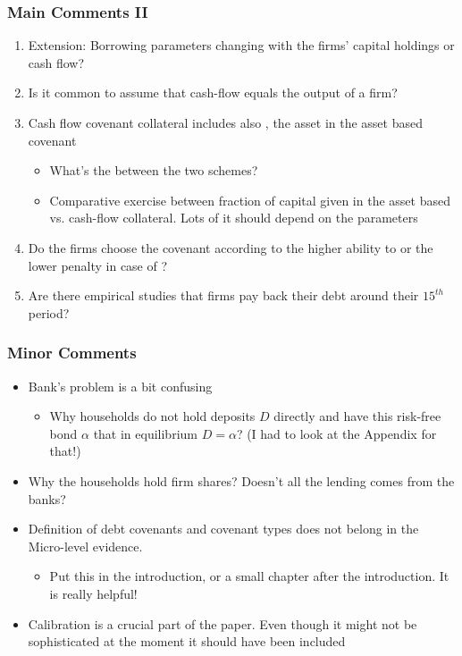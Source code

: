 \documentclass[xcolor=dvipsnames,handout]{beamer}
\begin{document}
\begin{frame}[t]\frametitle {\textbf{Main Comments II}} \label{conclusion}
\begin{enumerate} 
\item Extension: Borrowing parameters changing {\color{blue}{inversely}} with the firms' capital holdings or cash flow?
\item Is it common to assume that cash-flow equals the output of a firm?
\item Cash flow covenant collateral includes also {\color{blue}{capital}}, the asset in the asset based covenant
\begin{itemize}
    \item What's the {\color{blue}{relationship}} between the two schemes?
    \item Comparative exercise between fraction of capital given in the asset based vs. cash-flow collateral. Lots of it should depend on the parameters
\end{itemize}
\item Do the firms choose the covenant according to the higher ability to {\color{blue}{borrow}} or the lower penalty in case of {\color{blue}{default}}?
\item Are there empirical studies that firms pay back their debt around their $15^{th}$ period?
\end{enumerate}
\end{frame}

\begin{frame}[t]\frametitle {\textbf{Minor Comments}} \label{conclusion}
\begin{itemize}
\item Bank's problem is a bit confusing
\begin{itemize}
    \item Why households do not hold deposits $D$ directly and have this risk-free bond $\alpha$ that in equilibrium $D=\alpha$? 
    (I had to look at the Appendix for that!)
\end{itemize}
\item Why the households hold firm shares? Doesn't all the lending comes from the banks?
\item Definition of debt covenants and covenant types does not belong in the Micro-level evidence. 
\begin{itemize}
    \item Put this in the introduction, or a small chapter after the introduction. It is really helpful!
\end{itemize}
\item Calibration is a crucial part of the paper. Even though it might not be sophisticated at the moment it should have been included

\end{itemize}
\end{frame}
\end{document}

